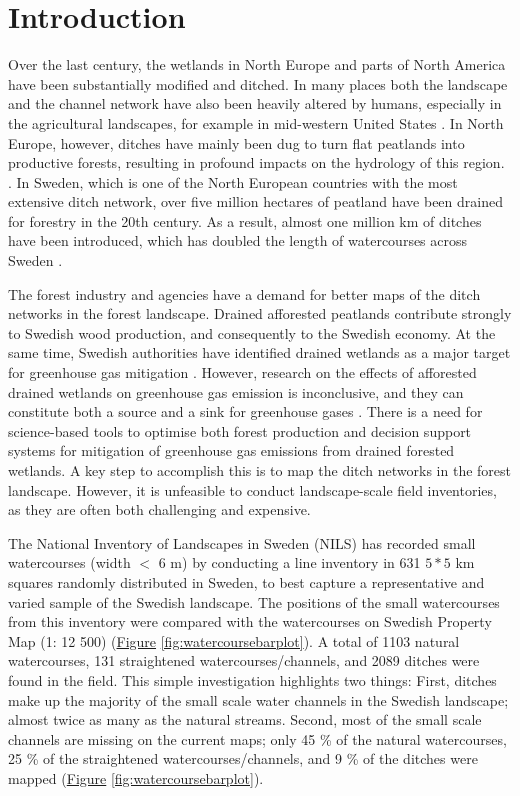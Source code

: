 \documentclass[11pt, review]{elsarticle} %
\begin{document}
\newpage
\section{Introduction}\label{introduction}

Over the last century, the wetlands in North Europe and parts of North America have been substantially modified and ditched. In many places both the landscape and the channel network have also been heavily altered  by humans, especially in the agricultural landscapes, for example in mid-western United States \citep{passalacqua}. In North Europe, however, ditches have mainly been dug to turn flat peatlands into productive forests, resulting in profound impacts on the hydrology of this region. \citep{peatlands}. In Sweden, which is one of the North European countries with the most extensive ditch network, over five million hectares of peatland have been drained for forestry in the 20th century.  As a result, almost one million km of ditches have been introduced, which has doubled the length of watercourses across Sweden  \citep{hasselquist}.

The forest industry and agencies have a demand for better maps of the ditch networks in the forest landscape. Drained afforested peatlands contribute strongly to Swedish wood production, and consequently to the Swedish economy. At the same time, Swedish authorities have identified drained wetlands as a major target for greenhouse gas mitigation \citep{greenhouse_skogsstyrelsen, greenhouse_jordbruksverket}. However, research on the effects of afforested drained wetlands on greenhouse gas emission is inconclusive, and they can constitute both a source and a sink for greenhouse gases \citep{greenhouse_yes, greenhouse_no}. There is a need for science-based tools to optimise both forest production and decision support systems for mitigation of greenhouse gas emissions from drained forested wetlands. A key step to accomplish this is to map the ditch networks in the forest landscape. However, it is unfeasible to conduct landscape-scale field inventories, as they are often both challenging and expensive.

The National Inventory of Landscapes in Sweden (NILS) has recorded small watercourses (width $<$ 6 m) by conducting a line inventory in 631 $5*5$ km squares randomly distributed in Sweden, to best capture a representative and varied sample of the Swedish landscape. The positions of the small watercourses from this inventory were compared with the watercourses on Swedish Property Map (1: 12 500) (\hyperref[fig:watercoursebarplot]{Figure} \ref{fig:watercoursebarplot}). A total of 1103 natural watercourses, 131 straightened watercourses/channels, and 2089 ditches were found in the field. This simple investigation highlights two things: First, ditches make up the majority of the small scale water channels in the Swedish landscape; almost twice as many as the natural streams. Second, most of the small scale channels are missing on the current maps; only 45 \% of the natural watercourses, 25 \% of the straightened watercourses/channels, and 9 \% of the ditches were mapped (\hyperref[fig:watercoursebarplot]{Figure} \ref{fig:watercoursebarplot}).
\end{document}
